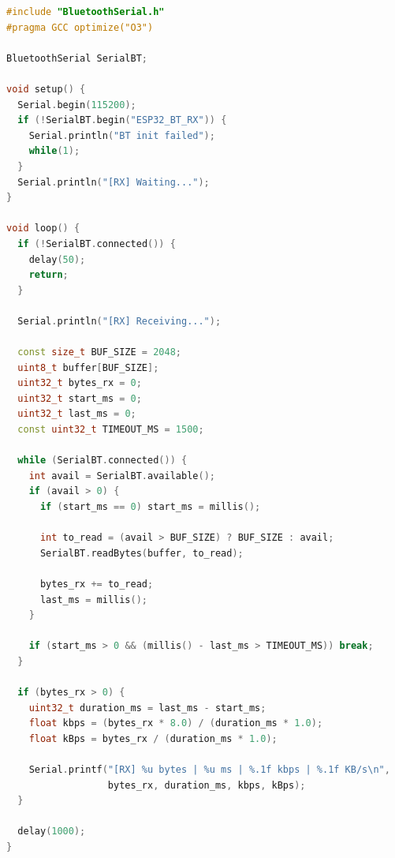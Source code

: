 \begin{lstlisting}[language=C++, caption={Прошивка ESP32\_BT\_RX.ino}, label={lst:ESP32_BT_RX.ino}]
#include "BluetoothSerial.h"
#pragma GCC optimize("O3")

BluetoothSerial SerialBT;

void setup() {
  Serial.begin(115200);
  if (!SerialBT.begin("ESP32_BT_RX")) {
    Serial.println("BT init failed");
    while(1);
  }
  Serial.println("[RX] Waiting...");
}

void loop() {
  if (!SerialBT.connected()) {
    delay(50);
    return;
  }
  
  Serial.println("[RX] Receiving...");
  
  const size_t BUF_SIZE = 2048;
  uint8_t buffer[BUF_SIZE];
  uint32_t bytes_rx = 0;
  uint32_t start_ms = 0;
  uint32_t last_ms = 0;
  const uint32_t TIMEOUT_MS = 1500;

  while (SerialBT.connected()) {
    int avail = SerialBT.available();
    if (avail > 0) {
      if (start_ms == 0) start_ms = millis();
      
      int to_read = (avail > BUF_SIZE) ? BUF_SIZE : avail;
      SerialBT.readBytes(buffer, to_read);
      
      bytes_rx += to_read;
      last_ms = millis();
    }
    
    if (start_ms > 0 && (millis() - last_ms > TIMEOUT_MS)) break;
  }
  
  if (bytes_rx > 0) {
    uint32_t duration_ms = last_ms - start_ms;
    float kbps = (bytes_rx * 8.0) / (duration_ms * 1.0);
    float kBps = bytes_rx / (duration_ms * 1.0);
    
    Serial.printf("[RX] %u bytes | %u ms | %.1f kbps | %.1f KB/s\n", 
                  bytes_rx, duration_ms, kbps, kBps);
  }
  
  delay(1000);
}
\end{lstlisting}


